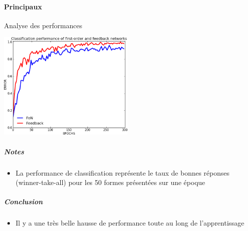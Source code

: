     \paragraph{Principaux}
      Analyse des performances
      \begin{center}
	\includegraphics[width=250px]{data/expF2/perff.png}
      \end{center}
      \subparagraph{Notes}
	\begin{itemize}
	  \item La performance de classification représente le taux de bonnes réponses (winner-take-all) pour les 50 formes présentées sur une époque
	\end{itemize}
      \subparagraph{Conclusion}
	\begin{itemize}
	  \item Il y a une très belle hausse de performance toute au long de l'apprentissage
	\end{itemize}
